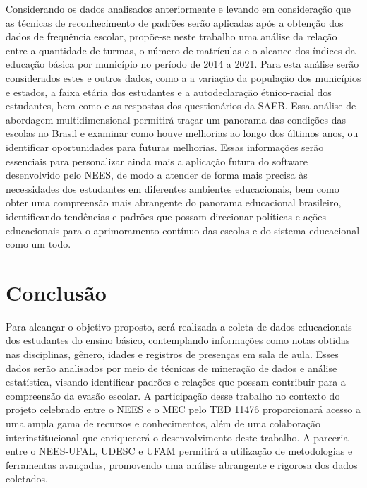 Considerando os dados analisados anteriormente e levando em consideração que as técnicas de reconhecimento de padrões serão aplicadas após a obtenção dos dados de frequência escolar, propõe-se neste trabalho uma análise da relação entre a quantidade de turmas, o número de matrículas e o alcance dos índices da educação básica por município no período de 2014 a 2021. Para esta análise serão considerados estes e outros dados, como a a variação da população dos municípios e estados, a faixa etária dos estudantes e a autodeclaração étnico-racial dos estudantes, bem como e as respostas dos questionários da SAEB. Essa análise de abordagem multidimensional permitirá traçar um panorama das condições das escolas no Brasil e examinar como houve melhorias ao longo dos últimos anos, ou identificar oportunidades para futuras melhorias. Essas informações serão essenciais para personalizar ainda mais a aplicação futura do software desenvolvido pelo NEES, de modo a atender de forma mais precisa às necessidades dos estudantes em diferentes ambientes educacionais, bem como obter uma compreensão mais abrangente do panorama educacional brasileiro, identificando tendências e padrões que possam direcionar políticas e ações educacionais para o aprimoramento contínuo das escolas e do sistema educacional como um todo.



\section{Conclusão}

Para alcançar o objetivo proposto, será realizada a coleta de dados educacionais dos estudantes do ensino básico, contemplando informações como notas obtidas nas disciplinas, gênero, idades e registros de presenças em sala de aula. Esses dados serão analisados por meio de técnicas de mineração de dados e análise estatística, visando identificar padrões e relações que possam contribuir para a compreensão da evasão escolar. A participação desse trabalho no contexto do projeto celebrado entre o NEES e o MEC pelo TED 11476 proporcionará acesso a uma ampla gama de recursos e conhecimentos, além de uma colaboração interinstitucional que enriquecerá o desenvolvimento deste trabalho. A parceria entre o NEES-UFAL, UDESC e UFAM permitirá a utilização de metodologias e ferramentas avançadas, promovendo uma análise abrangente e rigorosa dos dados coletados.

